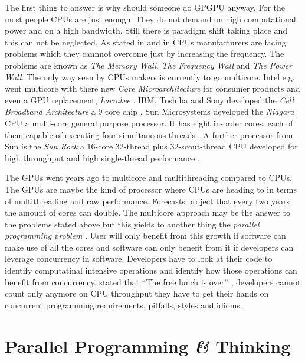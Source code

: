 The first thing to answer is why should someone do \gls{GPGPU} anyway. For the
most people \glspl{CPU} are just enough. They do not demand on high
computational power and on a high bandwidth. Still there is paradigm shift
taking place and this can not be neglected. As stated in
\citep{citeulike:1187394} and in \citep{citeulike:3421647} \glspl{CPU}
manufacturers are facing problems which they cannnot overcome just by increasing
the frequency. The problems are known as \emph{The Memory
Wall}\citep{citeulike:457955}, \emph{The Frequency Wall} and \emph{The Power
Wall}. The only way seen by \glspl{CPU} makers is currently to go multicore.
Intel e.g. went multicore with there new \emph{Core Microarchitecture} for
consumer products and even a \gls{GPU} replacement, \emph{Larrabee}
\citep{citeulike:3153758}. \Gls{IBM}, Toshiba and Sony developed the \emph{Cell
Broadband Architecture} a 9 core chip \citep{citeulike:1243173}. Sun Microsystems
developed the \emph{Niagara} \gls{CPU} a multi-core general purpose processor. 
It has eight in-order cores, each of them capable of executing four simultaneous threads
\citep{citeulike:3743958}. A further processor from Sun is the \emph{Sun Rock} a
16-core 32-thread plus 32-scout-thread \gls{CPU} developed for high throughput
and high single-thread performance \citep{citeulike:6643579}.

The \glspl{GPU} went years ago to multicore and multithreading compared to
\glspl{CPU}. The \glspl{GPU} are maybe the kind of processor where \glspl{CPU}
are heading to in terms of multithreading and raw performance. Forecasts project
that every two years the amount of cores can double. The multicore approach may
be the answer to the problems stated above but this yields to another thing the
\emph{parallel programming problem} \citep{citeulike:3750573}. User will only
benefit from this growth if software can make use of all the cores and software
can only benefit from it if developers can leverage concurrency in software.
Developers have to look at their code to identify computatinal intensive
operations and identify how those operations can benefit from concurrency.
\citep{citeulike:6643735} stated that ``The free
lunch is over'' , developers cannot count only anymore on \gls{CPU} throughput
they have to get their hands on concurrent programming requirements, pitfalls,
styles and idioms \citep{citeulike:6643735}.


\section{Parallel Programming \textit{\&} Thinking} %
\label{sec:parallel_programming__thinking}

